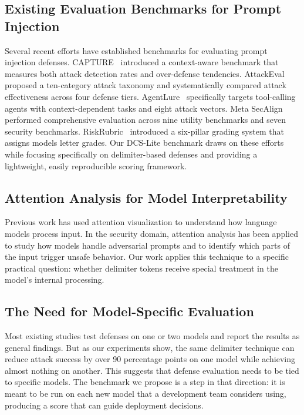 \documentclass[journal]{IEEEtran}
\begin{document}
\subsection{Existing Evaluation Benchmarks for Prompt Injection}
Several recent efforts have established benchmarks for evaluating prompt injection defenses. CAPTURE~\cite{kholkar2025capture} introduced a context-aware benchmark that measures both attack detection rates and over-defense tendencies. AttackEval~\cite{wang2026attackeval} proposed a ten-category attack taxonomy and systematically compared attack effectiveness across four defense tiers. AgentLure~\cite{weng2026argus} specifically targets tool-calling agents with context-dependent tasks and eight attack vectors. Meta SecAlign~\cite{chen2026meta} performed comprehensive evaluation across nine utility benchmarks and seven security benchmarks. RiskRubric~\cite{riskrubric2025} introduced a six-pillar grading system that assigns models letter grades. Our DCS-Lite benchmark draws on these efforts while focusing specifically on delimiter-based defenses and providing a lightweight, easily reproducible scoring framework.

\subsection{Attention Analysis for Model Interpretability}
Previous work has used attention visualization to understand how language models process input. In the security domain, attention analysis has been applied to study how models handle adversarial prompts and to identify which parts of the input trigger unsafe behavior. Our work applies this technique to a specific practical question: whether delimiter tokens receive special treatment in the model's internal processing.

\subsection{The Need for Model-Specific Evaluation}
Most existing studies test defenses on one or two models and report the results as general findings. But as our experiments show, the same delimiter technique can reduce attack success by over 90 percentage points on one model while achieving almost nothing on another. This suggests that defense evaluation needs to be tied to specific models. The benchmark we propose is a step in that direction: it is meant to be run on each new model that a development team considers using, producing a score that can guide deployment decisions.
\end{document}
